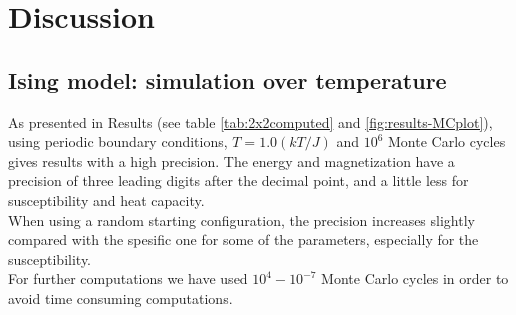 \documentclass[../main.tex]{subfiles}
\begin{document}
\section{Discussion}

\subsection{Ising model: simulation over temperature}
As presented in Results (see table \ref{tab:2x2computed} and \ref{fig:results-MCplot}), using periodic boundary conditions, $T = 1.0(kT/J)$ and $10^6$ Monte Carlo cycles gives results with a high precision. The energy and magnetization have a precision of three leading digits after the decimal point, and a little less for susceptibility and heat capacity. \\
When using a random starting configuration, the precision increases slightly compared with the spesific one for some of the parameters, especially for the susceptibility. \\
For further computations we have used $10^4 - 10^{-7}$ Monte Carlo cycles in order to avoid time consuming computations.

\end{document}
